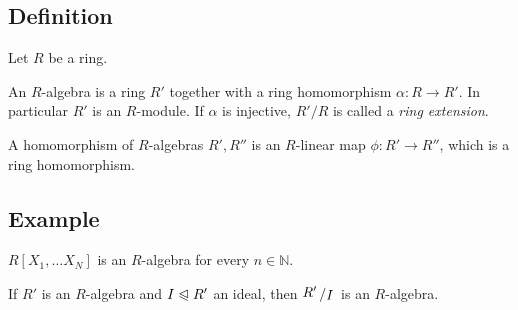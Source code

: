 \documentclass[12pt]{book}
\newcommand{\slant}[2]{{\raisebox{.1em}{$#1$}\left/\raisebox{-.1em}{$#2$}\right.}}
\begin{document}
\begin{spacing}{1.3}
\subsection{Definition} %
Let $R$ be a ring.
\begin{compactenum}
\item An $R$-algebra is a ring $R'$ together with a ring homomorphism $\alpha: R \longrightarrow R'$. In particular $R'$ is an $R$-module. If $\alpha$ is injective, $R'/R$ is called a \textit{ring extension}.
\item A homomorphism of $R$-algebras $R', R''$ is an $R$-linear map $\phi: R' \longrightarrow R''$, which is a ring homomorphism.
\end{compactenum}

\subsection*{Example} %
\titleformat{\subsection}{\normalfont\normalsize\bfseries}{}{0em}{#1 \thesubsection}
\begin{compactenum}
\item $R[X_1,\ldots X_N]$ is an $R$-algebra for every $n \in \mathbb{N}$. 
\item If $R'$ is an $R$-algebra and $I \trianglelefteqslant R'$ an ideal, then $\slant{R'}{I}$ is an $R$-algebra.
\end{compactenum}


\end{spacing}
\end{document}
